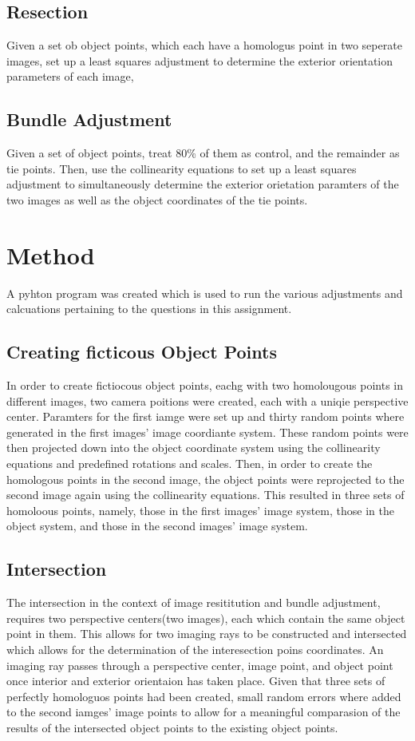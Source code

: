 \documentclass{article}
\begin{document}
\subsection{Resection}
Given a set ob object points, which each have a homologus point in two seperate images, set up a least squares adjustment 
to determine the exterior orientation parameters of each image,

\subsection{Bundle Adjustment}
Given a set of object points, treat 80\% of them as control, and the remainder as tie points. 
Then, use the collinearity equations to set up a least squares adjustment to simultaneously determine the exterior 
orietation paramters of the two images as well as the object coordinates of the tie points.

\newpage

\section{Method}
A pyhton program was created which is used to run the various adjustments and calcuations pertaining to the questions 
in this assignment.

\subsection{Creating ficticous Object Points}
In order to create fictiocous object points, eachg with two homolougous points in different images, 
two camera poitions were created, each with a uniqie perspective center. 
Paramters for the first iamge were set up and thirty random points where generated in the first images' image coordiante system. 
These random points were then projected down into the object coordinate system using the collinearity equations and 
predefined rotations and scales. Then, in order to create the homologous points in the second image, the object points were 
reprojected to the second image again using the collinearity equations. 
This resulted in three sets of homoloous points, namely, those in the first images' image system, those in the object system, 
and those in the second images' image system.

\subsection{Intersection}
The intersection in the context of image resititution and bundle adjustment, requires two perspective centers(two images), 
each which contain the same object point in them. 
This allows for two imaging rays to be constructed and intersected which allows for the determination of the interesection poins coordinates.
An imaging ray passes through a perspective center, image point, and object point once interior and exterior orientaion has taken place.
Given that three sets of perfectly homologuos points had been created, small random errors where added to the second iamges' image points 
to allow for a meaningful comparasion of the results of the intersected object points to the existing object points.
\end{document}
